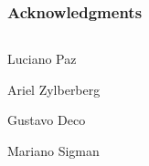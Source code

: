 \documentclass[final]{beamer}
\begin{document}
\begin{frame}
\frametitle{Acknowledgments}
\begin{columns}
\begin{column}{0.5\textwidth}
\begin{center}
Luciano Paz\\
\vspace{1cm}

Ariel Zylberberg\\
\vspace{1cm}

Gustavo Deco\\
\vspace{1cm}

Mariano Sigman
\end{center}
\end{column}
\begin{column}{0.5\textwidth}
\end{column}
\end{columns}
\end{frame}
\end{document}
